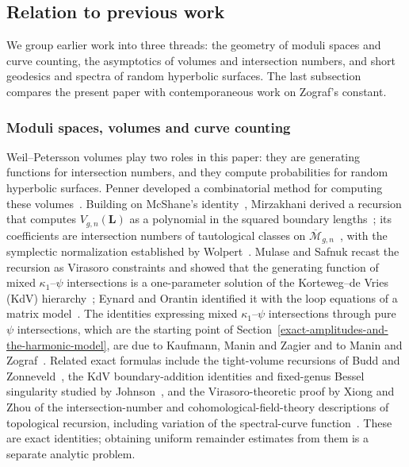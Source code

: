 \subsection{Relation to previous work}
We group earlier work into three threads: the geometry of moduli spaces
and curve counting, the asymptotics of volumes and intersection numbers,
and short geodesics and spectra of random hyperbolic surfaces. The last
subsection compares the present paper with contemporaneous work on
Zograf's constant.

\subsubsection{Moduli spaces, volumes and curve counting}
Weil--Petersson volumes play two roles in this paper: they are
generating functions for intersection numbers, and they compute
probabilities for random hyperbolic surfaces.
Penner developed a combinatorial method for computing these
volumes~\cite{Penner}.
Building on McShane's identity~\cite{McShane}, Mirzakhani derived
a recursion that computes $V_{g,n}(\mathbf L)$ as a polynomial in
the squared boundary lengths~\cite{MirInv}; its coefficients are
intersection numbers of tautological classes on
$\overline{\mathcal M}_{g,n}$~\cite{MirJAMS}, with the symplectic
normalization established by Wolpert~\cite{Wolpert}. Mulase and Safnuk
recast the recursion as Virasoro constraints and showed that the
generating function of mixed $\kappa_1$--$\psi$ intersections is a
one-parameter solution of the Korteweg--de Vries (KdV) hierarchy~\cite{MS};
Eynard and Orantin identified it with the loop equations of a matrix
model~\cite{EO}. The identities expressing mixed $\kappa_1$--$\psi$
intersections through pure $\psi$ intersections, which are the starting
point of Section~\ref{exact-amplitudes-and-the-harmonic-model}, are due
to Kaufmann, Manin and Zagier and to Manin and Zograf~\cite{KMZ,ManZ}.
Related exact formulas include the tight-volume recursions of Budd and
Zonneveld~\cite{BZ}, the KdV boundary-addition identities and
fixed-genus Bessel singularity studied by Johnson~\cite{Johnson}, and
the Virasoro-theoretic proof by Xiong and Zhou of the intersection-number
and cohomological-field-theory descriptions of topological recursion,
including variation of the spectral-curve
function~\cite[Theorem~1.1 and Section~5.7]{XZ}. These are exact
identities; obtaining uniform remainder estimates from them is a
separate analytic problem.

